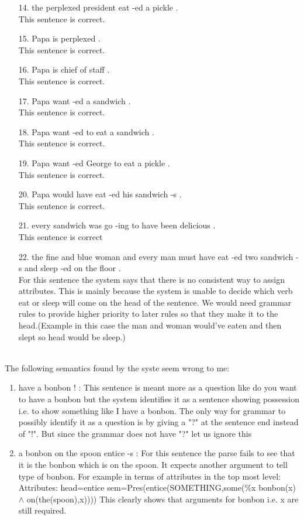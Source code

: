 \documentclass{article}
\begin{document}
\begin{enumerate}
\begin{enumerate}
\item[14.] the perplexed president eat -ed a pickle .
\\This sentence is correct.
\item[15.] Papa is perplexed .
\\This sentence is correct.
\item[16.] Papa is chief of staff .
\\This sentence is correct.
\item[17.] Papa want -ed a sandwich .
\\This sentence is correct.
\item[18.] Papa want -ed to eat a sandwich .
\\This sentence is correct.
\item[19.] Papa want -ed George to eat a pickle .
\\This sentence is correct.
\item[20.] Papa would have eat -ed his sandwich -s .
\\This sentence is correct.
\item[21.] every sandwich was go -ing to have been delicious .
\\This sentence is correct
\item[22.] the fine and blue woman and every man must have eat -ed two sandwich -s and sleep -ed on the floor .
\\For this sentence the system says that there is no consistent way to assign attributes. This is mainly because the system is unable to decide which verb eat or sleep will come on the head of the sentence. We would need grammar rules to provide higher priority to later rules so that they make it to the head.(Example in this case the man and woman would've eaten and then slept so head would be sleep.)
    \end{enumerate}
    
    \\The following semantics found by the syste seem wrong to me:
    \begin{enumerate}
        \item have a bonbon ! : This sentence is meant more as a question like do you want to have a bonbon but the system identifies it as a sentence showing possession i.e. to show something like I have a bonbon. The only way for grammar to possibly identify it as a question is by giving a "?" at the sentence end instead of "!". But since the grammar does not have "?" let us ignore this
        \item a bonbon on the spoon entice -s : For this sentence the parse fails to see that it is the bonbon which is on the spoon. It expects another argument to tell type of bonbon. For example in terms of attributes in the top most level:
        Attributes: head=entice sem=Pres(entice(SOMETHING,some(\%x bonbon(x) $\wedge$ on(the(spoon),x))))
        This clearly shows that arguments for bonbon i.e. x are still required. 
        

\end{enumerate}
\end{enumerate}
\end{document}
